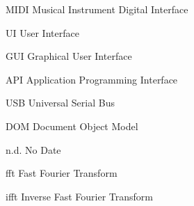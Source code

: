 \begin{acronyms}
  \item[MIDI] Musical Instrument Digital Interface
  \item[UI] User Interface
  \item[GUI] Graphical User Interface
  \item[API] Application Programming Interface
  \item[USB] Universal Serial Bus
  \item[DOM] Document Object Model
  \item[n.d.] No Date
  \item[fft] Fast Fourier Transform
  \item[ifft] Inverse Fast Fourier Transform
\end{acronyms}
